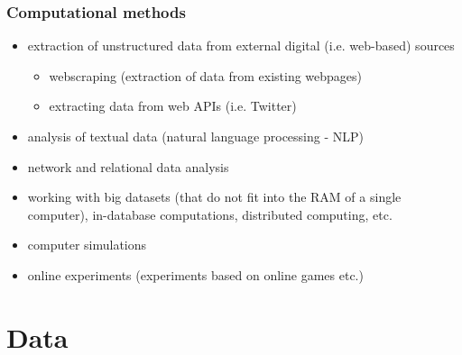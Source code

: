 \documentclass{beamer}
\begin{document}
\begin{frame}
    \frametitle{Computational methods}
    \begin{itemize}
        \item<1> extraction of unstructured data from external digital (i.e. web-based) sources
        \begin{itemize}
            \item<1> webscraping (extraction of data from existing webpages)
            \item<1> extracting data from web APIs (i.e. Twitter)
        \end{itemize}
        \item<1> analysis of textual data (natural language processing - NLP)
        \item<0> network and relational data analysis
        \item<0> working with big datasets (that do not fit into the RAM of a single computer), in-database computations, distributed computing, etc.
        \item<0> computer simulations
        \item<0> online experiments (experiments based on online games etc.)
    \end{itemize}
\end{frame}

\section[Data]{Data}
\end{document}
